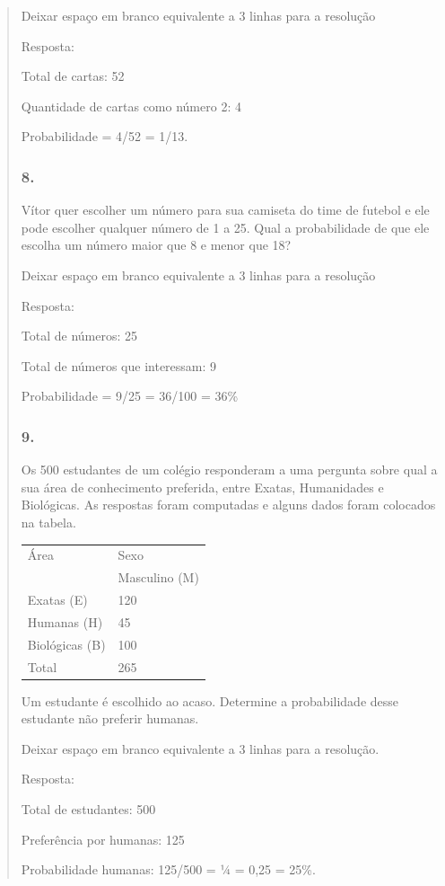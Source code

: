 \begin{enumerate}
\begin{escolha}
\begin{enumerate}
\begin{itemize}
\begin{itemize}
\begin{escolha}
\begin{quote}
\begin{escolha}
Deixar espaço em branco equivalente a 3 linhas para a resolução

Resposta:

Total de cartas: 52

Quantidade de cartas como número 2: 4

Probabilidade = 4/52 = 1/13.

\subsubsection{8.}\label{section-85}

Vítor quer escolher um número para sua camiseta do time de futebol e ele
pode escolher qualquer número de 1 a 25. Qual a probabilidade de que ele
escolha um número maior que 8 e menor que 18?

Deixar espaço em branco equivalente a 3 linhas para a resolução

Resposta:

Total de números: 25

Total de números que interessam: 9

Probabilidade = 9/25 = 36/100 = 36\%

\subsubsection{9.}\label{section-86}

Os 500 estudantes de um colégio responderam a uma pergunta sobre qual a
sua área de conhecimento preferida, entre Exatas, Humanidades e
Biológicas. As respostas foram computadas e alguns dados foram colocados
na tabela.

\begin{longtable}[]{@{}ll@{}}
\toprule
Área & Sexo\tabularnewline
& Masculino (M)\tabularnewline
Exatas (E) & 120\tabularnewline
Humanas (H) & 45\tabularnewline
Biológicas (B) & 100\tabularnewline
Total & 265\tabularnewline
\bottomrule
\end{longtable}

Um estudante é escolhido ao acaso. Determine a probabilidade desse
estudante não preferir humanas.

Deixar espaço em branco equivalente a 3 linhas para a resolução.

Resposta:

Total de estudantes: 500

Preferência por humanas: 125

Probabilidade humanas: 125/500 = ¼ = 0,25 = 25\%.


\end{escolha}
\end{quote}
\end{escolha}
\end{itemize}
\end{itemize}
\end{enumerate}
\end{escolha}
\end{enumerate}
